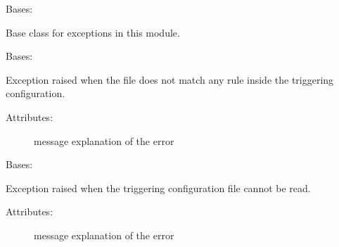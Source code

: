 \begin{fulllineitems}
\label{\detokenize{eboa.triggering:eboa.triggering.errors.Error}}
Bases: 

Base class for exceptions in this module.

\end{fulllineitems}


\begin{fulllineitems}
\label{\detokenize{eboa.triggering:eboa.triggering.errors.FileDoesNotMatchAnyRule}}
Bases: {\hyperref[\detokenize{eboa.triggering:eboa.triggering.errors.Error}]{}}

Exception raised when the file does not match any rule inside the triggering configuration.
\begin{description}
\item[{Attributes:}] \leavevmode
message \textendash{} explanation of the error

\end{description}

\end{fulllineitems}


\begin{fulllineitems}
\label{\detokenize{eboa.triggering:eboa.triggering.errors.TriggeringConfigCannotBeRead}}
Bases: {\hyperref[\detokenize{eboa.triggering:eboa.triggering.errors.Error}]{}}

Exception raised when the triggering configuration file cannot be read.
\begin{description}
\item[{Attributes:}] \leavevmode
message \textendash{} explanation of the error

\end{description}

\end{fulllineitems}

